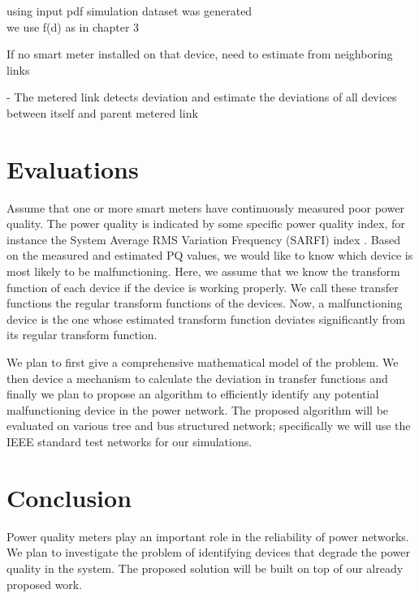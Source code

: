 \documentclass[12pt,oneside]{book}
\begin{document}
using input pdf simulation dataset was generated\\
we use f(d) as in chapter 3

If no smart meter installed on that device, need to estimate from neighboring links

- The metered link detects deviation and estimate the deviations of all devices between itself and parent metered link

\section{Evaluations}
Assume that one or more smart meters have continuously measured poor power quality. The power quality is indicated by some specific power quality index, for instance the System Average RMS Variation Frequency (SARFI) index . Based on the measured and estimated PQ values, we would like to know which device is most likely to be malfunctioning. Here, we assume that we know the transform function of each device if the device is working properly. We call these transfer functions the regular transform functions of the devices. Now, a malfunctioning device is the one whose estimated transform function deviates significantly from its regular transform function.

We plan to first give a comprehensive mathematical model of the problem. We then device a mechanism to calculate the deviation in transfer functions and finally we plan to propose an algorithm to efficiently identify any potential malfunctioning device in the power network. The proposed algorithm will be evaluated on various tree and bus structured network; specifically we will use the IEEE standard test networks for our simulations.

\section{Conclusion}
Power quality meters play an important role in the reliability of power networks. We plan to investigate the problem of identifying devices that degrade the power quality in the system. The proposed solution will be built on top of our already proposed work.


\end{document}
